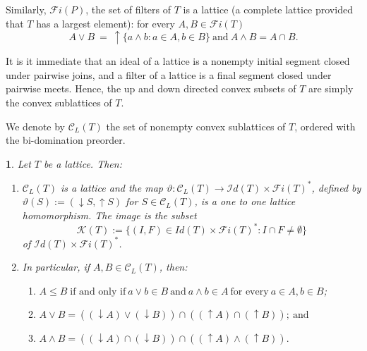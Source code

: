 \documentclass[12pt]{amsart}
\newtheorem{proposition}[definition]{\noindent {\bf Proposition}}
\begin{document}
\noindent
Similarly, $\mathcal {F}i(P)$, the set of filters of $T$ is a lattice
(a complete lattice provided that $T$ has a largest element): for
every $A, B\in \mathcal {F}i (T)$ $$A\vee B \ = \ {\uparrow \!\!}\{a
\wedge b: a\in A, b\in B\} \ \text{and} \ A\wedge B= A\cap B. $$

It is it immediate that an ideal of a lattice is a nonempty initial
segment closed under pairwise joins, and a filter of a lattice is a
final segment closed under pairwise meets.  Hence, the up and down
directed convex subsets of $T$ are simply the convex sublattices of
$T$.  

We denote by $\mathcal C_L(T)$ the set of nonempty convex sublattices
of $T$, ordered with the bi-domination preorder.

\begin{proposition} Let  $T$ be a lattice. Then: 
\begin{enumerate} [{(a)}]

\item  $\mathcal{C}_{ L}(T)$ is a lattice and the map  
$\vartheta: \mathcal{C}_{ L}(T)\rightarrow \mathcal {I}d(T) \times
\mathcal {F}i(T)^*$, defined by $\vartheta(S):= ({\downarrow \!\!} S,
{\uparrow \!\!} S)$ for $S\in \mathcal{C}_{ L}(T)$, is a one to one
lattice homomorphism. The image is the subset $$\mathcal K(T):= \{(I,
F)\in {I}d(T)\times \mathcal {F}i(T)^*: I\cap F\not =\emptyset\}$$ of
$\mathcal {I}d(T)\times \mathcal {F}i(T)^*$.\\

\item In particular, if  $A, B\in \mathcal C_{L}(T)$,  then:\\[-.2cm]
\begin{enumerate}[{(i)}]

\item $A\leq B\; \text{if and only if} \ a\vee b \in B \ \text
{and} \ a\wedge b \in A \ \text {for every} \ a\in A, b\in B$;
\\[-.2cm]
    
\item $A\vee B=( ({\downarrow \!\!} A) \vee ({\downarrow \!\!} B)) \cap(( {\uparrow \!\!} A ) \cap ({\uparrow \!\!} B)) ; \ \text{and}$  \\[-.2cm]
    
\item $A\wedge B=( ({\downarrow \!\!} A) \cap ({\downarrow \!\!} B))
\cap(( {\uparrow \!\!} A ) \wedge({\uparrow \!\!} B)). $
   
\end{enumerate}
 
\end{enumerate}
 
\end{proposition} 
\end{document}
